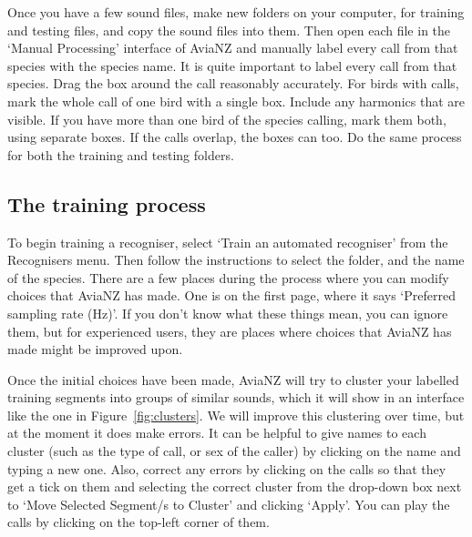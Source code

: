 \documentclass{article}
\begin{document}
Once you have a few sound files, make new folders on your computer, for training and testing files, and copy the sound files into them. Then open each file in the `Manual Processing' interface of AviaNZ and manually label every call from that species with the species name. It is quite important to label every call from that species. Drag the box around the call reasonably accurately. For birds with calls, mark the whole call of one bird with a single box. Include any harmonics that are visible. If you have more than one bird of the species calling, mark them both, using separate boxes. If the calls overlap, the boxes can too. Do the same process for both the training and testing folders.

\subsection{The training process}

To begin training a recogniser, select `Train an automated recogniser' from the Recognisers menu. Then follow the instructions to select the folder, and the name of the species. There are a few places during the process where you can modify choices that AviaNZ has made. One is on the first page, where it says `Preferred sampling rate (Hz)'. If you don't know what these things mean, you can ignore them, but for experienced users, they are places where choices that AviaNZ has made might be improved upon. 

Once the initial choices have been made, AviaNZ will try to cluster your labelled training segments into groups of similar sounds, which it will show in an interface like the one in Figure~\ref{fig:clusters}. We will improve this clustering over time, but at the moment it does make errors. It can be helpful to give names to each cluster (such as the type of call, or sex of the caller) by clicking on the name and typing a new one. Also, correct any errors by clicking on the calls so that they get a tick on them and selecting the correct cluster from the drop-down box next to `Move Selected Segment/s to Cluster' and clicking `Apply'. You can play the calls by clicking on the top-left corner of them. 
\end{document}
